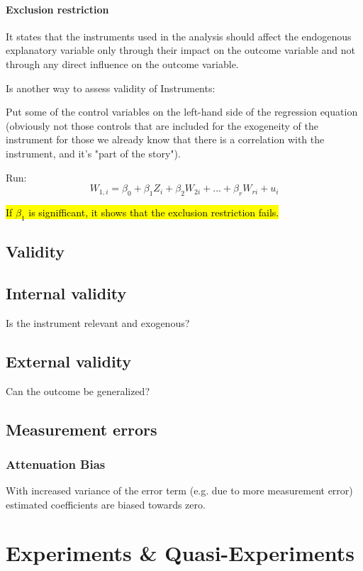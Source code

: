 \documentclass[a3paper, 8pt]{extarticle}
\begin{document}
\begin{multicols*}{5}
\paragraph{Exclusion restriction} It states that the instruments used in the analysis should affect the endogenous explanatory variable only through their impact on the outcome variable and not through any direct influence on the outcome variable.

Is another way to assess validity of Instruments:

Put some of the control variables on the left-hand side of the regression equation (obviously not those controls that are included for the exogeneity of the instrument for those we already know that there is a correlation with the instrument, and it's "part of the story").

Run:
$$W_{1,i} =\beta_0 +\beta_1 Z_i + \beta_2 W_{2i} + ... + \beta_r W_{ri} +u_i$$



\hl{If $\beta_1$ is signifficant, it shows that the exclusion restriction fails.}



\subsection{Validity}

\subsection{Internal validity}
Is the instrument relevant and exogenous?

\subsection{External validity}
Can the outcome be generalized?

\subsection{Measurement errors}

\subsubsection{Attenuation Bias}
With increased variance of the error term (e.g. due to more measurement error) estimated coefficients are biased towards zero.


\section{Experiments \& Quasi-Experiments}


\end{multicols*}
\end{document}
